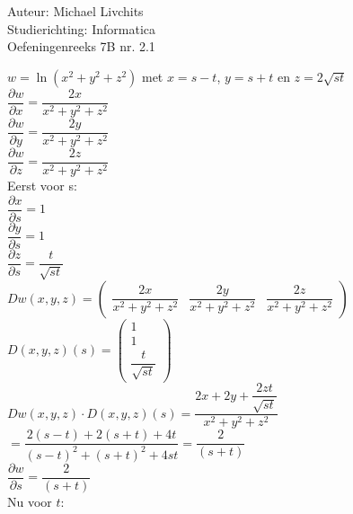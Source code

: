 \documentclass[a4paper]{article}
\begin{document}
  
\noindent \large Auteur: Michael Livchits \\
\noindent \large Studierichting: Informatica\\
\noindent \large Oefeningenreeks 7B nr. 2.1\\

\medskip

\normalsize

$w = \ln(x^2+y^2+z^2)$ met $x = s-t$, $y = s+t$ en $z = 2\sqrt{st}$\\

$\dfrac{\partial w}{\partial x} = \dfrac{2x}{x^2+y^2+z^2}$\\

$\dfrac{\partial w}{\partial y} = \dfrac{2y}{x^2+y^2+z^2}$\\

$\dfrac{\partial w}{\partial z} = \dfrac{2z}{x^2+y^2+z^2}$\\

Eerst voor s:\\

$\dfrac{\partial x}{\partial s} = 1$\\

$\dfrac{\partial y}{\partial s} = 1$\\

$\dfrac{\partial z}{\partial s} = \dfrac{t}{\sqrt{st}}$\\

$Dw(x,y,z)=\left(\begin{array}{ccc}
\dfrac{2x}{x^2+y^2+z^2} & \dfrac{2y}{x^2+y^2+z^2} &\dfrac{2z}{x^2+y^2+z^2}
\end{array}\right)$\\

$D(x,y,z)(s)=\left(\begin{array}{c}
1 \\
1 \\
\dfrac{t}{\sqrt{st}}
\end{array}\right)$\\

$Dw(x,y,z)\cdot D(x,y,z)(s) = \dfrac{2x+2y+\dfrac{2zt}{\sqrt{st}}}{x^2+y^2+z^2}$\\

$= \dfrac{2(s-t)+2(s+t)+4t}{(s-t)^2+(s+t)^2+4st} = \dfrac{2}{(s+t)}$\\

$\dfrac{\partial w}{\partial s}= \dfrac{2}{(s+t)}$\\

Nu voor $t$:\\
\end{document}
